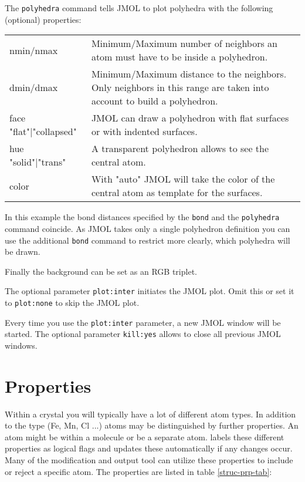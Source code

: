 The {\tt polyhedra} command tells JMOL to plot polyhedra with the 
following (optional) properties:

\begin{tabularx}{\textwidth}{p{40mm}X}
nmin/nmax & Minimum/Maximum number of neighbors an atom must have to 
      be inside a polyhedron.  \\
dmin/dmax & Minimum/Maximum distance to the neighbors. Only neighbors
      in this range are taken into account to build a polyhedron. \\
face {"flat"|"collapsed"} & JMOL can draw a polyhedron with flat surfaces 
      or with indented surfaces. \\
hue {"solid"|"trans"} & A transparent polyhedron allows to see the 
      central atom. \\
color & With "auto" JMOL will take the color of the central atom 
      as template for the surfaces. \\
\end{tabularx}

In this example the bond distances specified by the {\tt bond} and the
{\tt polyhedra} command coincide. As JMOL takes only a single 
polyhedron definition you can use the additional {\tt bond} command to 
restrict more clearly, which polyhedra will be drawn.

Finally the background can be set as an RGB triplet.

The optional parameter {\tt plot:inter} initiates the JMOL plot. Omit this 
or set it to {\tt plot:none} to skip the JMOL plot. 

Every time you use the {\tt plot:inter} parameter, a new JMOL window 
will be started. The optional parameter {\tt kill:yes} allows to
close all previous JMOL windows.


\section{Properties \label{struc-properties}}

Within a crystal you will typically have a lot of different atom types. 
In addition to the type (Fe, Mn, Cl ...) atoms may be distinguished by
further properties. An atom might be within a molecule or be a separate
atom. \Discus labels these different properties as logical flags 
and updates these 
automatically if any changes occur. Many of the modification and output
tool can utilize these properties to include or reject a specific atom.
The properties are listed in table \ref{struc-prp-tab}:

